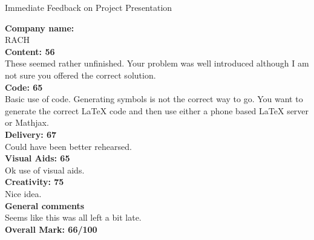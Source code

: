 \documentclass{article}
\begin{document}
\begin{center}
\Huge{Immediate Feedback on Project Presentation}\\
\end{center}


\normalsize
\textbf{Company name:}\\

RACH \\

\textbf{Content: 56}\\

These seemed rather unfinished.
Your problem was well introduced although I am not sure you offered the correct solution.\\

\textbf{Code: 65}\\

Basic use of code.
Generating symbols is not the correct way to go.
You want to generate the correct LaTeX code and then use either a phone based LaTeX server or Mathjax.\\

\textbf{Delivery: 67}\\

Could have been better rehearsed.\\

\textbf{Visual Aids: 65}\\

Ok use of visual aids.\\

\textbf{Creativity: 75}\\

Nice idea.\\

\textbf{General comments}\\

Seems like this was all left a bit late.\\

\textbf{Overall Mark: 66/100}
\end{document}
